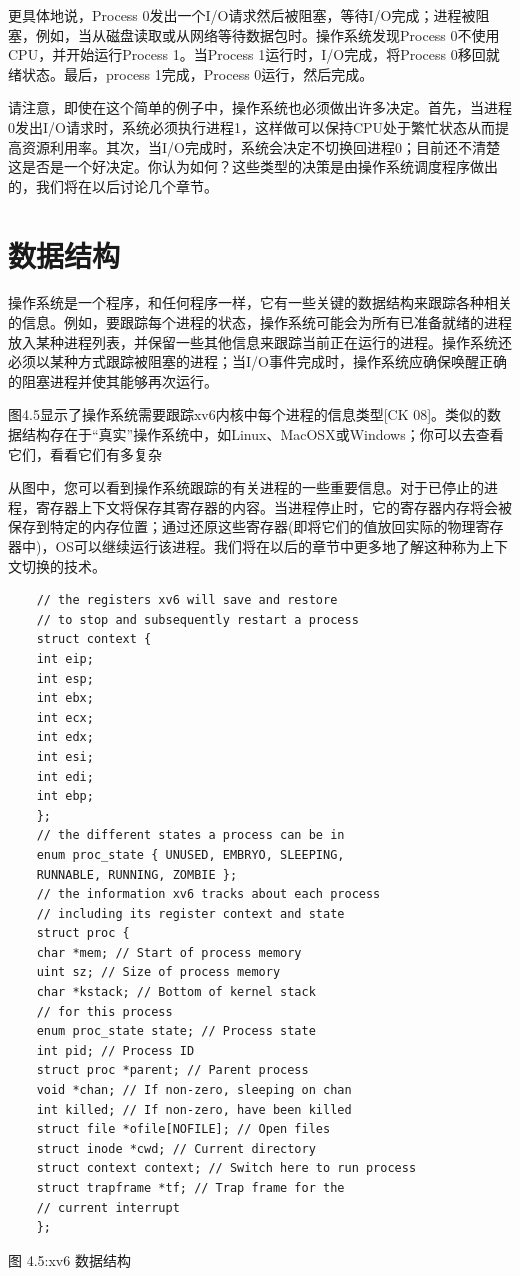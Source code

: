 更具体地说，Process 0发出一个I/O请求然后被阻塞，等待I/O完成；进程被阻塞，例如，当从磁盘读取或从网络等待数据包时。操作系统发现Process 0不使用CPU，并开始运行Process 1。当Process 1运行时，I/O完成，将Process 0移回就绪状态。最后，process 1完成，Process 0运行，然后完成。

请注意，即使在这个简单的例子中，操作系统也必须做出许多决定。首先，当进程0发出I/O请求时，系统必须执行进程1，这样做可以保持CPU处于繁忙状态从而提高资源利用率。其次，当I/O完成时，系统会决定不切换回进程0；目前还不清楚这是否是一个好决定。你认为如何？这些类型的决策是由操作系统调度程序做出的，我们将在以后讨论几个章节。

\section{数据结构}
操作系统是一个程序，和任何程序一样，它有一些关键的数据结构来跟踪各种相关的信息。例如，要跟踪每个进程的状态，操作系统可能会为所有已准备就绪的进程放入某种进程列表，并保留一些其他信息来跟踪当前正在运行的进程。操作系统还必须以某种方式跟踪被阻塞的进程；当I/O事件完成时，操作系统应确保唤醒正确的阻塞进程并使其能够再次运行。

图4.5显示了操作系统需要跟踪xv6内核中每个进程的信息类型[CK 08]。类似的数据结构存在于“真实”操作系统中，如Linux、MacOSX或Windows；你可以去查看它们，看看它们有多复杂

从图中，您可以看到操作系统跟踪的有关进程的一些重要信息。对于已停止的进程，寄存器上下文将保存其寄存器的内容。当进程停止时，它的寄存器内存将会被保存到特定的内存位置；通过还原这些寄存器(即将它们的值放回实际的物理寄存器中)，OS可以继续运行该进程。我们将在以后的章节中更多地了解这种称为上下文切换的技术。

\begin{lstlisting}
    // the registers xv6 will save and restore
    // to stop and subsequently restart a process
    struct context {
    int eip;
    int esp;
    int ebx;
    int ecx;
    int edx;
    int esi;
    int edi;
    int ebp;
    };
    // the different states a process can be in
    enum proc_state { UNUSED, EMBRYO, SLEEPING,
    RUNNABLE, RUNNING, ZOMBIE };
    // the information xv6 tracks about each process
    // including its register context and state
    struct proc {
    char *mem; // Start of process memory
    uint sz; // Size of process memory
    char *kstack; // Bottom of kernel stack
    // for this process
    enum proc_state state; // Process state
    int pid; // Process ID
    struct proc *parent; // Parent process
    void *chan; // If non-zero, sleeping on chan
    int killed; // If non-zero, have been killed
    struct file *ofile[NOFILE]; // Open files
    struct inode *cwd; // Current directory
    struct context context; // Switch here to run process
    struct trapframe *tf; // Trap frame for the
    // current interrupt
    };
\end{lstlisting}
                图 4.5:xv6 数据结构

